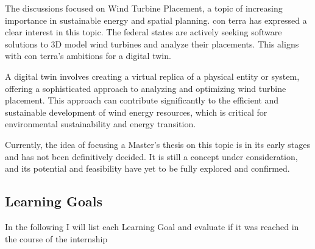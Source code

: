 \documentclass[11pt, titlepage, a4paper]{article}
\begin{document}
The discussions focused on Wind Turbine Placement, a topic of increasing importance in sustainable energy and spatial planning. con terra has expressed a clear interest in this topic. The federal states are actively seeking software solutions to 3D model wind turbines and analyze their placements. This aligns with con terra's ambitions for a digital twin.

A digital twin involves creating a virtual replica of a physical entity or system, offering a sophisticated approach to analyzing and optimizing wind turbine placement. This approach can contribute significantly to the efficient and sustainable development of wind energy resources, which is critical for environmental sustainability and energy transition.

Currently, the idea of focusing a Master's thesis on this topic is in its early stages and has not been definitively decided. It is still a concept under consideration, and its potential and feasibility have yet to be fully explored and confirmed. %

\subsection{Learning Goals}
In the following I will list each Learning Goal and evaluate if it was reached in the course of the internship
\end{document}
